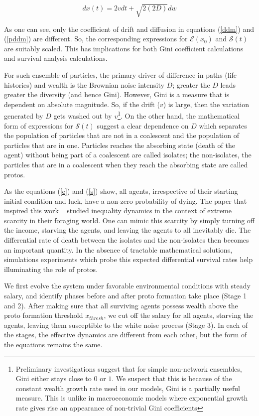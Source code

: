 \documentclass[sigconf]{acmart}
\begin{document}
\begin{equation}\label{pddm}
dx(t) = 2vdt + \sqrt{2(2D)} dw
\end{equation}

As one can see, only the coefficient of drift and diffusion in equations (\ref{ddm}) and (\ref{pddm}) are different. So, the corresponding expressions for $\mathcal{E}(x_0)$ and $\mathcal{S}(t)$ are suitably scaled. This has implications for both Gini coefficient calculations and survival analysis calculations. 

For such ensemble of particles, the primary driver of difference in paths (life histories) and wealth is the Brownian noise intensity $D$; greater the $D$ leads greater the diversity (and hence Gini). However, Gini is a measure that is dependent on absolute magnitude. So, if the drift ($v$) is large, then the variation generated by
$D$ gets washed out by $v$\footnote{Preliminary investigations suggest that for simple non-network ensembles, Gini either stays close to $0$ or $1$. We suspect that this is because of the constant wealth growth rate used in our models, Gini is a partially useful measure. This is unlike in macroeconomic models where exponential growth rate gives rise an appearance of non-trivial Gini coefficients}.  On the other hand, the mathematical form of expressions for $\mathcal{S}(t)$ suggest a clear dependence on $D$ which separates the population of particles that are not in a coalescent and the population of particles that are in one. Particles reaches the absorbing state (death of the agent) without being part of a coalescent are called isolates; the non-isolates, the particles that are in a coalescent when they reach the absorbing state are called protos. 

As the equations (\ref{e}) and (\ref{s}) show, all agents, irrespective of their starting initial condition and luck, have a non-zero probability of dying. The paper that inspired this work ~\cite{srimil} studied inequality dynamics in the context of extreme scarcity in their foraging world. One can mimic this scarcity by simply turning off the income, starving the agents, and leaving the agents to all inevitably die. The differential rate of death between the isolates and the non-isolates then becomes an important quantity. In the absence of tractable mathematical solutions, simulations experiments which probe this expected differential survival rates help illuminating the role of protos. 

We first evolve the system under favorable environmental conditions with steady salary, and identify phases before and after proto formation take place (Stage 1 and 2). After making sure that all surviving agents possess  wealth above the proto formation threshold $x_{thresh}$, we cut off the salary for all agents, starving the agents, leaving them susceptible to the white noise process (Stage 3). In each of the stages, the effective dynamics are different from each other, but the form of the equations remains the same. 
\end{document}
